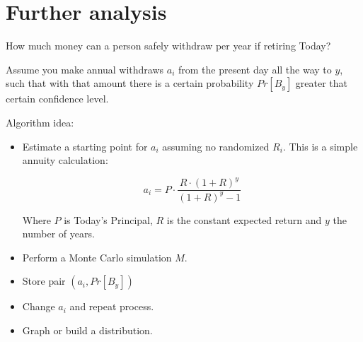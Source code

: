 \documentclass[8pt]{article}
\begin{document}
\section{Further analysis}

How much money can a person safely withdraw per year if retiring Today?

Assume you make annual withdraws $a_i$ from the present day all the way to $y$, such that with that amount there is a certain probability $Pr[B_y]$ greater that certain confidence level.

Algorithm idea:
\begin{itemize}
\item Estimate a starting point for $a_i$ assuming no randomized $R_i$.  This is a simple annuity calculation:

\[ a_i=P \cdot \frac{R \cdot (1+R)^y}{(1+R)^y-1}\]

Where $P$ is Today's Principal, $R$ is the constant expected return and $y$ the number of years.

\item Perform a Monte Carlo simulation $M$.
\item Store pair $(a_i, Pr[B_y])$
\item Change $a_i$ and repeat process.
\item Graph or build a distribution.
\end{itemize}
\end{document}
